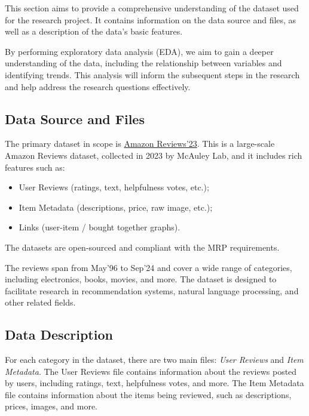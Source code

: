 \documentclass[11pt,a4paper,openany,oneside,titlepage]{article}
\begin{document}
This section aims to provide a comprehensive understanding of the dataset used for the research project. It contains information on the data source and files, as well as a description of the data's basic features. 

By performing exploratory data analysis (EDA), we aim to gain a deeper understanding of the data, including the relationship between variables and identifying trends. This analysis will inform the subsequent steps in the research and help address the research questions effectively.

\subsection{Data Source and Files}

The primary dataset in scope is \href{https://amazon-reviews-2023.github.io/index.html}{Amazon Reviews'23}. This is a large-scale Amazon Reviews dataset, collected in 2023 by McAuley Lab, and it includes rich features such as:
\begin {itemize}
\item User Reviews (ratings, text, helpfulness votes, etc.);
\item Item Metadata (descriptions, price, raw image, etc.);
\item Links (user-item / bought together graphs).
\end {itemize}

The datasets are open-sourced and compliant with the MRP requirements. 

The reviews span from May'96 to Sep'24 and cover a wide range of categories, including electronics, books, movies, and more. The dataset is designed to facilitate research in recommendation systems, natural language processing, and other related fields.


\subsection{Data Description}

For each category in the dataset, there are two main files: \textit{User Reviews} and \textit{Item Metadata}. The User Reviews file contains information about the reviews posted by users, including ratings, text, helpfulness votes, and more. The Item Metadata file contains information about the items being reviewed, such as descriptions, prices, images, and more.
\end{document}
